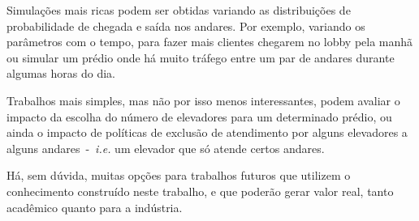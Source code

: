 Simulações mais ricas podem ser obtidas variando as distribuições de
probabilidade de chegada e saída nos andares. Por exemplo, variando os
parâmetros com o tempo, para fazer mais clientes chegarem no lobby pela manhã ou
simular um prédio onde há muito tráfego entre um par de andares durante algumas
horas do dia.

Trabalhos mais simples, mas não por isso menos interessantes, podem avaliar o
impacto da escolha do número de elevadores para um determinado prédio, ou ainda
o impacto de políticas de exclusão de atendimento por alguns elevadores a alguns
andares~-~\textit{i.e.} um elevador que só atende certos andares.

Há, sem dúvida, muitas opções para trabalhos futuros que utilizem o conhecimento
construído neste trabalho, e que poderão gerar valor real, tanto acadêmico
quanto para a indústria.
